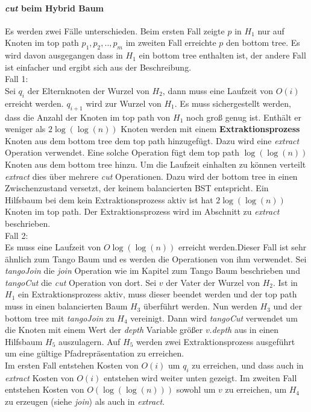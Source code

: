 \documentclass[a4paper,12pt]{article}
\begin{document}
\paragraph{\textit{cut} beim Hybrid Baum}
Es werden zwei Fälle unterschieden. Beim ersten Fall zeigte $p$ in $H_1$ nur auf Knoten im top path $p_1,p_2,..,p_m$ im zweiten Fall erreichte $p$ den bottom tree. Es wird davon ausgegangen dass in $H_1$ ein bottom tree enthalten ist, der andere Fall ist einfacher und ergibt sich aus der Beschreibung.\\
Fall 1:\\
Sei $q_i$ der Elternknoten der Wurzel von $H_2$, dann muss eine Laufzeit von $O\left(i\right)$ erreicht werden.  $q_{i+1}$ wird zur Wurzel von $H_1$. Es muss sichergestellt werden, dass die Anzahl der Knoten im top path von $H_1$ noch groß genug ist. Enthält er weniger als $2 \log\left(\log\left(n\right)\right)$ Knoten werden mit einem \textbf{Extraktionsprozess} Knoten aus dem bottom tree dem top path hinzugefügt. Dazu wird eine \textit{extract} Operation verwendet. Eine solche Operation fügt dem top path $\log\left(\log\left(n\right)\right)$ Knoten aus dem bottom tree hinzu. Um die Laufzeit einhalten zu können verteilt {\textit{extract}} dies über mehrere \textit{cut} Operationen. Dazu wird der bottom tree in einen Zwischenzustand versetzt, der keinem balancierten BST entspricht. Ein Hilfsbaum bei dem kein Extraktionsprozess aktiv ist hat  $2 \log\left(\log\left(n\right)\right)$ Knoten im top path. Der Extraktionsprozess wird im Abschnitt zu \textit{extract} beschrieben.  \\
Fall 2:\\
Es muss eine Laufzeit von $O\log\left(\log\left(n\right)\right)$ erreicht werden.Dieser Fall ist sehr ähnlich zum Tango Baum und es werden die Operationen von ihm verwendet. Sei \textit{tangoJoin} die \textit{join} Operation wie im Kapitel zum Tango Baum beschrieben und \textit{tangoCut} die \textit{cut} Operation von dort. Sei $v$ der Vater der Wurzel von $H_2$. Ist in $H_1$ ein Extraktionsprozess aktiv, muss dieser beendet werden und der top path muss in einen balancierten Baum $H_3$ überführt werden. Nun werden $H_3$ und der bottom tree mit \textit{tangoJoin}  zu $H_4$ vereinigt. Dann wird \textit{tangoCut} verwendet um die Knoten mit einem Wert der \textit{depth} Variable größer $v.$\textit{depth} aus in einen Hilfsbaum $H_5$ auszulagern. Auf $H_5$ werden zwei Extraktionsprozess ausgeführt um eine gültige Pfadrepräsentation zu erreichen.  \\
Im ersten Fall entstehen Kosten von $O\left(i\right)$ um $q_i$ zu erreichen, und dass auch in \textit{extract} Kosten von $O\left(i\right)$ entstehen wird weiter unten gezeigt. Im zweiten Fall entstehen Kosten von $O\left(\log\left(\log\left(n\right)\right)\right)$ sowohl um $v$ zu erreichen, um $H_4$ zu erzeugen (siehe \textit{join}) als auch in \textit{extract}.
\end{document}
